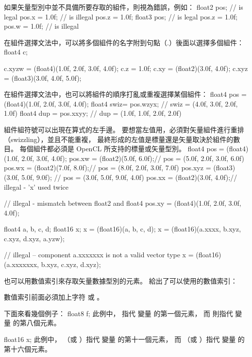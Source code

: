 如果矢量型別中並不具備所要存取的組件，則視為錯誤，例如：
\startclc
float2 pos;	// is legal
pos.x = 1.0f;	// is illegal
pos.z = 1.0f;
float3 pos;	// is legal
pos.z = 1.0f;
pos.w = 1.0f;	// is illegal
\stopclc

在組件選擇文法中，可以將多個組件的名字附到句點（.）後面以選擇多個組件：
\startclc
float4 c;

c.xyzw = (float4)(1.0f, 2.0f, 3.0f, 4.0f);
c.z = 1.0f;
c.xy = (float2)(3.0f, 4.0f);
c.xyz = (float3)(3.0f, 4.0f, 5.0f);
\stopclc

在組件選擇文法中，也可以將組件的順序打亂或重複選擇某個組件：
\startclc
float4 pos = (float4)(1.0f, 2.0f, 3.0f, 4.0f);
float4 swiz= pos.wzyx; // swiz = (4.0f, 3.0f, 2.0f, 1.0f)
float4 dup = pos.xxyy; // dup = (1.0f, 1.0f, 2.0f, 2.0f)
\stopclc

組件組符號可以出現在算式的左手邊。
要想當左值用，必須對矢量組件進行重排（swizzling），並且不能重複，
最終形成的左值是標量還是矢量取決於組件的數目。
每個組件都必須是 OpenCL 所支持的標量或矢量型別。
\startclc
float4 pos = (float4)(1.0f, 2.0f, 3.0f, 4.0f);
pos.xw = (float2)(5.0f, 6.0f);// pos = (5.0f, 2.0f, 3.0f, 6.0f)
pos.wx = (float2)(7.0f, 8.0f);// pos = (8.0f, 2.0f, 3.0f, 7.0f)
pos.xyz = (float3)(3.0f, 5.0f, 9.0f); // pos = (3.0f, 5.0f, 9.0f, 4.0f)
pos.xx = (float2)(3.0f, 4.0f);// illegal - 'x' used twice

// illegal - mismatch between float2 and float4
pos.xy = (float4)(1.0f, 2.0f, 3.0f, 4.0f);

float4 a, b, c, d;
float16 x;
x = (float16)(a, b, c, d);
x = (float16)(a.xxxx, b.xyz, c.xyz, d.xyz, a.yzw);

// illegal – component a.xxxxxxx is not a valid vector type
x = (float16)(a.xxxxxxx, b.xyz, c.xyz, d.xyz);
\stopclc

也可以用數值索引來存取矢量數據型別的元素。
給出了可以使用的數值索引：

{}

數值索引前面必須加上字符  或 。

下面來看幾個例子：
\startclc[indentnext=no]
float8	f;
\stopclc
此例中，
 指代  變量  的第一個元素，
而  則指代  變量  的第八個元素。

\startclc[indentnext=no]
float16	x;
\stopclc
此例中，
 （或 ）指代  變量  的第十一個元素，
而  （或 ）指代  變量  的第十六個元素。

